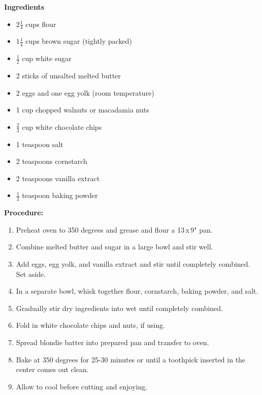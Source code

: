 \begin{multicols}{2}
\textbf{Ingredients}
\begin{itemize}
\item $2\frac{1}{4}$ cups flour
\item $1\frac{1}{4}$ cups brown sugar (tightly packed)
\item $\frac{1}{2}$ cup white sugar
\item 2 sticks of unsalted melted butter
\item 2 eggs and one egg yolk (room temperature)
\item 1 cup chopped walnuts or macadamia nuts
\item $\frac{2}{3}$ cup white chocolate chips
\item 1 teaspoon salt
\item 2 teaspoons cornstarch 
\item 2 teaspoons vanilla extract 
\item $\frac{1}{2}$ teaspoon baking powder




\end{itemize}


\columnbreak
\textbf{Procedure:}
\medskip


\begin{enumerate}
\item Preheat oven to 350 degrees and grease and flour a 13\,x\,9" pan. 


\medskip
\item Combine melted butter and sugar in a large bowl and stir well.
\medskip

\medskip
\item Add eggs, egg yolk, and vanilla extract and stir until completely combined. Set aside.
\medskip

\medskip
\item In a separate bowl, whisk together flour, cornstarch, baking powder, and salt.
\medskip

\medskip
\item Gradually stir dry ingredients into wet until completely combined.
\medskip

\medskip
\item Fold in white chocolate chips and nuts, if using.
\medskip

\medskip
\item Spread blondie batter into prepared pan and transfer to oven.
\medskip

\medskip
\item Bake at 350 degrees for 25-30 minutes or until a toothpick inserted in the center comes out clean.
\medskip

\medskip
\item Allow to cool before cutting and enjoying.
\medskip

\end{enumerate}

\end{multicols}